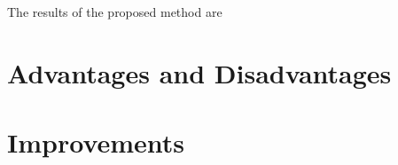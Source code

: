 \documentclass[]{article}
\begin{document}
The results of the proposed method are

\section{Advantages and Disadvantages}






\section{Improvements}




\clearpage


\end{document}
